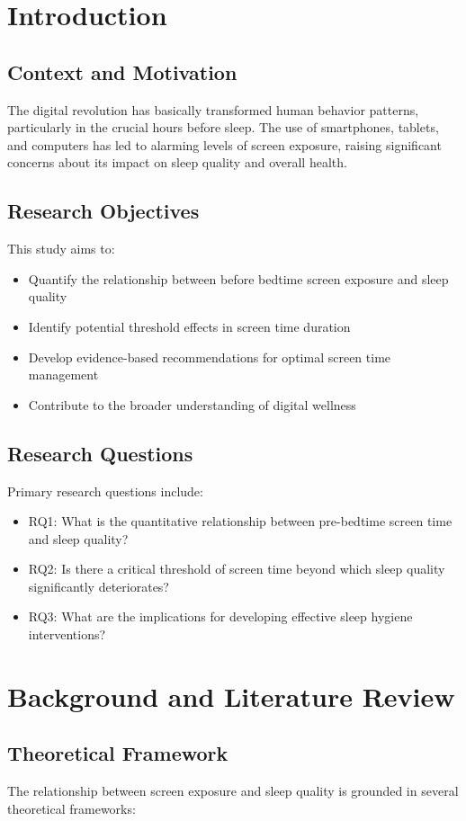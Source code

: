 \documentclass[conference]{IEEEtran}
\begin{document}
\section{Introduction}
\subsection{Context and Motivation}
The digital revolution has basically transformed human behavior patterns, particularly in the crucial hours before sleep. The use of smartphones, tablets, and computers has led to alarming levels of screen exposure, raising significant concerns about its impact on sleep quality and overall health.

\subsection{Research Objectives}
This study aims to:
\begin{itemize}
\item Quantify the relationship between before bedtime screen exposure and sleep quality
\item Identify potential threshold effects in screen time duration
\item Develop evidence-based recommendations for optimal screen time management
\item Contribute to the broader understanding of digital wellness
\end{itemize}

\subsection{Research Questions}
Primary research questions include:
\begin{itemize}
\item RQ1: What is the quantitative relationship between pre-bedtime screen time and sleep quality?
\item RQ2: Is there a critical threshold of screen time beyond which sleep quality significantly deteriorates?
\item RQ3: What are the implications for developing effective sleep hygiene interventions?
\end{itemize}

\section{Background and Literature Review}
\subsection{Theoretical Framework}
The relationship between screen exposure and sleep quality is grounded in several theoretical frameworks:
\end{document}
